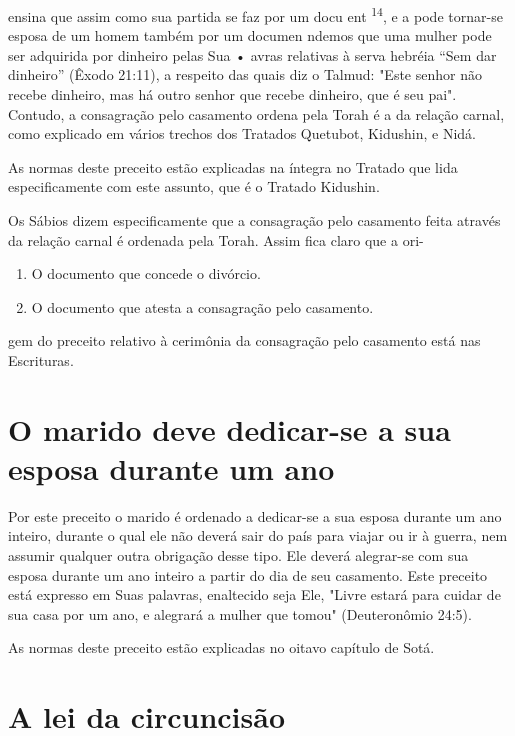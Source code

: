 ensina que assim como sua partida se faz por um docu ent
\textsuperscript{14}, e a pode tornar-se esposa de um homem também por
um documen ndemos que uma mulher pode ser adquirida por dinheiro pelas
Sua • avras relativas à serva hebréia ``Sem dar dinheiro'' (Êxodo 21:11),
a respeito das quais diz o Talmud: "Este senhor não recebe dinheiro, mas
há outro senhor que recebe dinheiro, que é seu pai". Contudo, a
consagração pelo casamento ordena pela Torah é a da relação carnal, como
explicado em vários trechos dos Tratados Quetubot, Kidushin, e Nidá.

As normas deste preceito estão explicadas na íntegra no Tratado que lida
especificamente com este assunto, que é o Tratado Kidushin.

Os Sábios dizem especificamente que a consagração pelo casamento feita
através da relação carnal é ordenada pela Torah. Assim fica claro que a
ori-


\begin{enumerate}
\def\labelenumi{\arabic{enumi}.}
\setcounter{enumi}{213}
\item
 
 O documento que concede o divórcio.
 
\item
 
 O documento que atesta a consagração pelo casamento.
 
\end{enumerate}




gem do preceito relativo à cerimônia da consagração pelo casamento está
nas Escrituras.

\section{O marido deve dedicar-se a sua esposa durante um ano}

Por este preceito o marido é ordenado a dedicar-se a sua esposa du­rante
um ano inteiro, durante o qual ele não deverá sair do país para viajar
ou ir à guerra, nem assumir qualquer outra obrigação desse tipo. Ele
deverá alegrar-se com sua esposa durante um ano inteiro a partir do dia
de seu casamento. Este preceito está expresso em Suas palavras,
enaltecido seja Ele, "Livre estará para cuidar de sua casa por um ano, e
alegrará a mulher que tomou" (Deutero­nômio 24:5).


As normas deste preceito estão explicadas no oitavo capítulo de Sotá.


\section{A lei da circuncisão}

